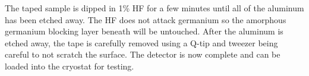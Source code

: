 The taped sample is dipped in 1\% HF for a few minutes until all of the aluminum has been etched away.
The HF does not attack germanium so the amorphous germanium blocking layer beneath will be untouched.
After the aluminum is etched away, the tape is carefully removed using a Q-tip and tweezer being careful to not scratch the surface.
The detector is now complete and can be loaded into the cryostat for testing.


